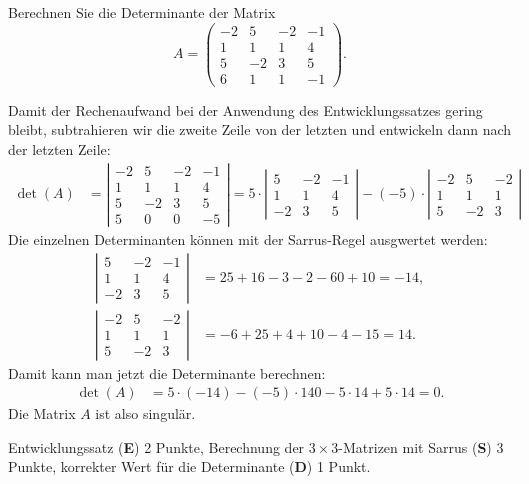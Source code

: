 Berechnen Sie die Determinante der Matrix
\[
A
=
\begin{pmatrix}
-2& 5&-2&-1\\
 1& 1& 1& 4\\
 5&-2& 3& 5\\
 6& 1& 1&-1
\end{pmatrix}.
\]

\begin{loesung}
Damit der Rechenaufwand bei der Anwendung des Entwicklungssatzes gering bleibt, subtrahieren wir die zweite Zeile von der letzten und entwickeln dann
nach der letzten Zeile:
\begin{align*}
\det(A)
&=
\left|\begin{matrix}
-2& 5&-2&-1\\
 1& 1& 1& 4\\
 5&-2& 3& 5\\
 5& 0& 0&-5
\end{matrix}\right|
=
5\cdot
\left|\begin{matrix}
 5&-2&-1\\
 1& 1& 4\\
-2& 3& 5
\end{matrix}\right|
-(-5)\cdot
\left|\begin{matrix}
-2& 5&-2\\
 1& 1& 1\\
 5&-2& 3
\end{matrix}\right|
\end{align*}
Die einzelnen Determinanten können mit der Sarrus-Regel ausgwertet werden:
\begin{align*}
\left|\begin{matrix}
 5&-2&-1\\
 1& 1& 4\\
-2& 3& 5
\end{matrix}\right|
&=
25+16-3 -2-60+10
=
-14,
\\
\left|\begin{matrix}
-2& 5&-2\\
 1& 1& 1\\
 5&-2& 3
\end{matrix}\right|
&=
-6+25+4+10-4-15
=
14.
\end{align*}
Damit kann man jetzt die Determinante berechnen:
\begin{align*}
\det(A)
&=
5\cdot (-14)-(-5)\cdot 14
0
-5\cdot 14 + 5\cdot 14 =0.
\end{align*}
Die Matrix $A$ ist also singulär.
\end{loesung}

\begin{bewertung}
Entwicklungssatz ({\bf E}) 2 Punkte,
Berechnung der $3\times 3$-Matrizen mit Sarrus ({\bf S}) 3 Punkte,
korrekter Wert für die Determinante ({\bf D}) 1 Punkt.
\end{bewertung}

